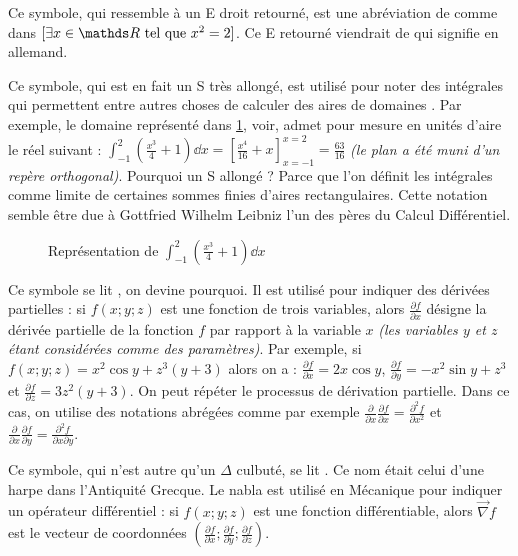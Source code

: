 \cadre{$\exists$} Ce symbole, qui ressemble à un E droit retourné, est une abréviation
de  comme dans $[ \exists x \in \RR \text{ tel que } x^2 = 2 ]$.
Ce E retourné viendrait de  qui signifie  en allemand.


\cadre{$\displaystyle \int$} Ce symbole, qui est en fait un S très allongé, est utilisé
pour noter des intégrales qui permettent entre autres choses de calculer des aires
de domaines . Par exemple, le domaine représenté dans
 \ref{domainIntegral}, voir, admet pour mesure en unités d'aire le réel suivant :
$ {\displaystyle \int_{-1}^{2}} (\frac{x^3}{4} + 1) \dd x = [ \frac{x^4}{16} + x ]_{x=-1}^{x=2} = \frac{63}{16}$
 \emph{(le plan a été muni d'un repère orthogonal)}.
Pourquoi un S allongé ? Parce que l'on définit les intégrales comme limite
de certaines sommes finies d'aires rectangulaires. Cette notation semble être
due à Gottfried Wilhelm Leibniz l'un des pères du Calcul Différentiel.

\begin{figure}[h]
	
	\vspace{-2em}
	\caption{%
		Représentation de%
		$ \displaystyle \int_{-1}^{2} \left( \frac{x^3}{4} + 1 \right)  \dd x $%
	}
	\label{domainIntegral}
\end{figure}


\cadre{$\partial$} Ce symbole\label{partialDer} se lit , on devine pourquoi.
Il est utilisé pour indiquer des dérivées partielles : si $f(x;y;z)$ est une fonction
de trois variables, alors $\frac{\partial f}{\partial x} $ désigne la dérivée partielle
de la fonction $f$ par rapport à la variable $x$ \emph{(les variables $y$ et $z$ étant
considérées comme des paramètres)}.
Par exemple, si $f(x;y;z) = x^{2} \cos y +  z^{3} (y + 3)$ alors on a :
$\frac{\partial f}{\partial x}  = 2 x \cos y$, $\frac{\partial f}{\partial y}  = - x^2 \sin y +  z^3$
et $\frac{\partial f}{\partial z}  = 3 z^2 (y + 3)$.
On peut répéter le processus de dérivation partielle. Dans ce cas, on utilise
des notations abrégées comme par exemple
$\frac{\partial}{\partial x} \frac{\partial f}{\partial x}  = \frac{\partial^2 f}{\partial x^2} $
et
$\frac{\partial}{\partial x} \frac{\partial f}{\partial y}  = \frac{\partial^2 f}{\partial x \partial y} $.


\cadre{$\nabla$} Ce symbole, qui n'est autre qu'un $\Delta$ culbuté, se lit .
Ce nom était celui d'une harpe dans l'Antiquité Grecque. Le nabla est utilisé en Mécanique
pour indiquer un opérateur différentiel : si $f(x;y;z)$ est une fonction différentiable,
alors $\vec{\nabla} f $ est le vecteur de coordonnées
$( \frac{\partial f}{\partial x} ; \frac{\partial f}{\partial y} ; \frac{\partial f}{\partial z})$.

